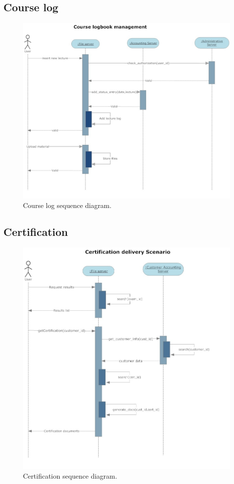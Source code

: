 \subsection{Course log}
\begin{figure}[H]
\begin{centering}
\includegraphics[scale=0.45]{assign3/sdraw/imgs/course_log.jpg}
\caption{Course log sequence diagram.}
\label{3img:[sequence]course_log}
\end{centering}
\end{figure}

\subsection{Certification}
\begin{figure}[H]
\begin{centering}
\includegraphics[scale=0.55]{assign3/sdraw/imgs/certification.jpg}
\caption{Certification sequence diagram.}
\label{3img:[sequence]certification}
\end{centering}
\end{figure}
